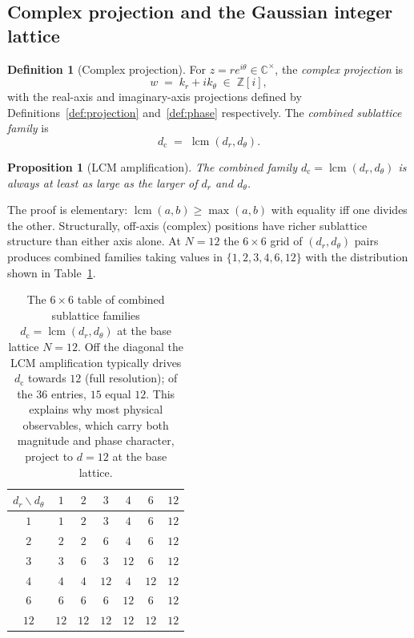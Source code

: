 \documentclass[11pt,a4paper]{article}
\newtheorem{proposition}[theorem]{Proposition}
\theoremstyle{definition}
\newtheorem{definition}[theorem]{Definition}
\theoremstyle{remark}
\newcommand{\Z}{\mathbb{Z}}
\newcommand{\C}{\mathbb{C}}
\DeclareMathOperator{\lcm}{lcm}
\begin{document}
\subsection{Complex projection and the Gaussian integer lattice}

\begin{definition}[Complex projection]\label{def:complex}
For $z = r e^{i\theta}\in\C^{\times}$, the \emph{complex projection} is
\[
w \;=\; k_{r}+i k_{\theta} \;\in\; \Z[i],
\]
with the real-axis and imaginary-axis projections defined by Definitions~\ref{def:projection} and~\ref{def:phase} respectively. The \emph{combined sublattice family} is
\[
d_{\mathrm{c}} \;=\; \lcm(d_{r},d_{\theta}).
\]
\end{definition}

\begin{proposition}[LCM amplification]\label{prop:lcm}
The combined family $d_{\mathrm{c}}=\lcm(d_{r},d_{\theta})$ is always at least as large as the larger of $d_{r}$ and $d_{\theta}$.
\end{proposition}

The proof is elementary: $\lcm(a,b)\ge \max(a,b)$ with equality iff one divides the other. Structurally, off-axis (complex) positions have richer sublattice structure than either axis alone. At $N=12$ the $6\times 6$ grid of $(d_{r},d_{\theta})$ pairs produces combined families taking values in $\{1,2,3,4,6,12\}$ with the distribution shown in Table~\ref{tab:complex12}.

\begin{table}[h]
\centering
\begin{tabular}{@{}c c c c c c c@{}}
\toprule
$d_{r}\backslash d_{\theta}$ & $1$ & $2$ & $3$ & $4$ & $6$ & $12$\\
\midrule
$1$ & $1$ & $2$ & $3$ & $4$ & $6$ & $12$\\
$2$ & $2$ & $2$ & $6$ & $4$ & $6$ & $12$\\
$3$ & $3$ & $6$ & $3$ & $12$ & $6$ & $12$\\
$4$ & $4$ & $4$ & $12$ & $4$ & $12$ & $12$\\
$6$ & $6$ & $6$ & $6$ & $12$ & $6$ & $12$\\
$12$ & $12$ & $12$ & $12$ & $12$ & $12$ & $12$\\
\bottomrule
\end{tabular}
\caption{The $6\times 6$ table of combined sublattice families $d_{\mathrm{c}}=\lcm(d_{r},d_{\theta})$ at the base lattice $N=12$. Off the diagonal the LCM amplification typically drives $d_{\mathrm{c}}$ towards $12$ (full resolution); of the $36$ entries, $15$ equal $12$. This explains why most physical observables, which carry both magnitude and phase character, project to $d=12$ at the base lattice.}
\label{tab:complex12}
\end{table}
\end{document}
